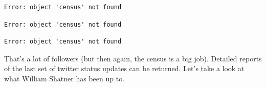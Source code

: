\begin{knitrout}
{\begin{kframe}
\begin{flushleft}
\hlkeyword{\usebox{\hlnormalsizeboxdollar}}\hlkeyword{(}\hlkeyword{)}\mbox{}
\normalfont
\end{flushleft}
\begin{verbatim}
Error: object 'census' not found
\end{verbatim}
\begin{flushleft}
\ttfamily\noindent
{}\hlkeyword{\usebox{\hlnormalsizeboxdollar}}\hlkeyword{(}\hlkeyword{)}\mbox{}
\normalfont
\end{flushleft}
\begin{verbatim}
Error: object 'census' not found
\end{verbatim}
\begin{flushleft}
\ttfamily\noindent
{}\hlkeyword{\usebox{\hlnormalsizeboxdollar}}\hlkeyword{(}\hlkeyword{)}\mbox{}
\normalfont
\end{flushleft}
\begin{verbatim}
Error: object 'census' not found
\end{verbatim}
\end{kframe}}
\end{knitrout}

That's a lot of followers (but then again, the census is a big job).  
Detailed reports of the last set of twitter status updates can be returned.
Let's take a look at what William Shatner has been up to.
\begin{knitrout}
\end{knitrout}

